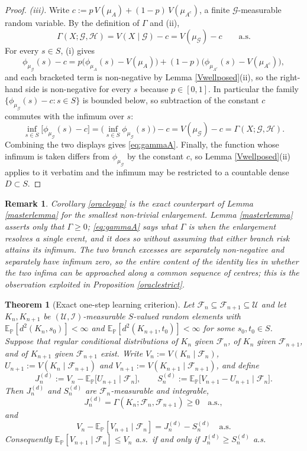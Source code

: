 \documentclass{article}
\newcommand{\E}{\mathbb{E}_{\mathbb{P}}}
\newcommand{\F}{\mathcal{F}}
\newcommand{\G}{\mathcal{G}}
\newcommand{\1}{\mathbbm{1}}
\newtheorem{remark}{Remark}
\newtheorem{theorem}{Theorem}
\begin{document}
\begin{proof}
\emph{(iii).} Write $c:=p\,V(\mu_A)+(1-p)\,V(\mu_{A^c})$, a finite
$\G$-measurable random variable. By the definition of $\Gamma$ and (ii),
\[
\Gamma(X;\G,\mathcal{H})=V(X\mid\G)-c=V(\mu_\G)-c\qquad\text{a.s.}
\]
For every $s\in S$, (i) gives
\[
\phi_{\mu_\G}(s)-c
=p\big(\phi_{\mu_A}(s)-V(\mu_A)\big)+(1-p)\big(\phi_{\mu_{A^c}}(s)-V(\mu_{A^c})\big),
\]
and each bracketed term is non-negative by Lemma \ref{Vwellposed}(ii), so the
right-hand side is non-negative for every $s$ because $p\in[0,1]$. In
particular the family $\{\phi_{\mu_\G}(s)-c:s\in S\}$ is bounded below, so
subtraction of the constant $c$ commutes with the infimum over $s$:
\[
\inf_{s\in S}\big[\phi_{\mu_\G}(s)-c\big]
=\Big(\inf_{s\in S}\phi_{\mu_\G}(s)\Big)-c=V(\mu_\G)-c
=\Gamma(X;\G,\mathcal{H}).
\]
Combining the two displays gives \eqref{eq:gammaA}. Finally, the function whose
infimum is taken differs from $\phi_{\mu_\G}$ by the constant $c$, so Lemma
\ref{Vwellposed}(ii) applies to it verbatim and the infimum may be restricted
to a countable dense $D\subset S$.
\end{proof}
 
\begin{remark}
Corollary \ref{oraclegap} is the exact counterpart of Lemma \ref{masterlemma}
for the smallest non-trivial enlargement. Lemma \ref{masterlemma} asserts only
that $\Gamma\ge0$; \eqref{eq:gammaA} says what $\Gamma$ \emph{is} when the
enlargement resolves a single event, and it does so without assuming that
either branch risk attains its infimum. The two branch excesses are separately
non-negative and separately have infimum zero, so the entire content of the
identity lies in whether the two infima can be approached along a
\emph{common} sequence of centres; this is the observation exploited in
Proposition \ref{oraclestrict}.
\end{remark}


\begin{theorem}[Exact one-step learning criterion]
\label{maincriterion}
Let $\F_n\subseteq\F_{n+1}\subseteq\mathcal{U}$ and let $K_n,K_{n+1}$ be
$(\mathcal U,\mathcal I)$-measurable $S$-valued random elements with
$\E[d^2(K_n,s_0)]<\infty$ and $\E[d^2(K_{n+1},t_0)]<\infty$ for some $s_0,t_0\in S$. Suppose that
regular conditional distributions of $K_n$ given $\F_n$, of $K_n$ given $\F_{n+1}$, and of
$K_{n+1}$ given $\F_{n+1}$ exist. Write $V_n:=V(K_n\mid\F_n)$, $U_{n+1}:=V(K_n\mid\F_{n+1})$ and
$V_{n+1}:=V(K_{n+1}\mid\F_{n+1})$, and define
\[
J_n^{(d)}:=V_n-\E\big[U_{n+1}\mid\F_n\big],
\qquad
S_n^{(d)}:=\E\big[V_{n+1}-U_{n+1}\mid\F_n\big].
\]
Then $J_n^{(d)}$ and $S_n^{(d)}$ are $\F_n$-measurable and integrable,
\[
J_n^{(d)}=\Gamma(K_n;\F_n,\F_{n+1})\ge 0\quad\text{a.s.},
\]
and
\[
V_n-\E[V_{n+1}\mid\F_n]=J_n^{(d)}-S_n^{(d)}\quad\text{a.s.}
\]
Consequently $\E[V_{n+1}\mid\F_n]\le V_n$ a.s.\ if and only if $J_n^{(d)}\ge S_n^{(d)}$ a.s.
\end{theorem}
\end{document}

